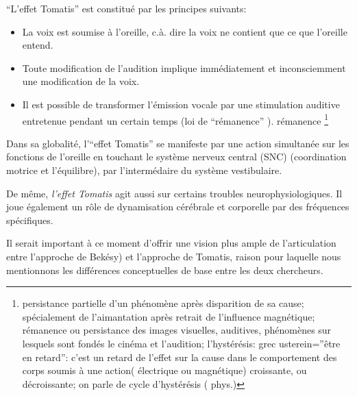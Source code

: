 ``L'effet Tomatis'' est constitué par les principes suivants:  
\begin{itemize}
	\item La voix est soumise à l'oreille, c.à. dire la voix ne contient que ce que l'oreille entend.
	\item Toute modification de l'audition implique immédiatement
          et inconsciemment une
          modification de la voix.
	\item Il est possible de transformer l'émission vocale par une stimulation 
auditive
		entretenue pendant un certain temps (loi de
                ``rémanence'' ). \gls{rémanence}
 \footnote{persistance partielle d'un phénomène
                après disparition de sa cause; spécialement de
                l'aimantation après retrait de l'influence magnétique;
                rémanence ou persistance des images visuelles, auditives,
                phénomènes sur lesquels sont fondés le cinéma et
                l'audition; l'hystérésis: grec usterein=''être en
                retard'': c'est un retard de l'effet sur la cause dans
                le comportement des corps soumis à une action(
                électrique ou magnétique) croissante, ou décroissante;
                on parle de cycle d'hystérésis ( phys.)}
\end{itemize}

Dans sa globalité, l'``effet Tomatis'' se manifeste par une action
simultanée sur les fonctions de
l'oreille en touchant le système nerveux central (SNC) (coordination
                motrice et l'équilibre), par l'intermédaire du système
                vestibulaire.

                De même, \textit{l'effet Tomatis} agit aussi sur certains troubles
                neurophysiologiques.
                Il joue également un rôle de dynamisation cérébrale et corporelle
               par des fréquences spécifiques.





Il serait important à ce moment d'offrir une vision plus ample de
l'articulation entre l'approche de Bekésy) et l'approche de Tomatis,
raison pour laquelle nous mentionnons les différences conceptuelles de
base entre les deux chercheurs.
